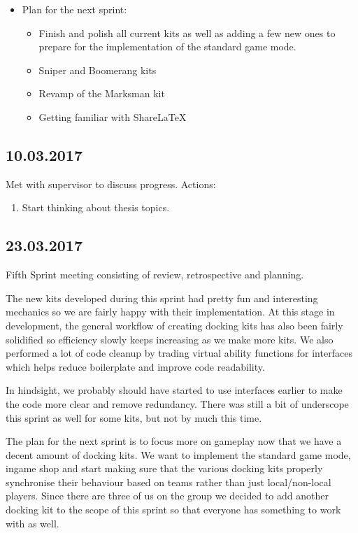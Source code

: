 \begin{itemize}
    \item Plan for the next sprint:
    \begin{itemize}
        \item Finish and polish all current kits as well as adding a few new ones to prepare for the implementation of the standard game mode.
        \item Sniper and Boomerang kits
        \item Revamp of the Marksman kit
        \item Getting familiar with ShareLaTeX
    \end{itemize}
\end{itemize}

\subsection*{10.03.2017}
Met with supervisor to discuss progress. Actions:
\begin{enumerate}
    \item Start thinking about thesis topics.
\end{enumerate}

\subsection*{23.03.2017}
Fifth Sprint meeting consisting of review, retrospective and planning.

The new kits developed during this sprint had pretty fun and interesting mechanics so we are fairly happy with their implementation. At this stage in development, the general workflow of creating docking kits has also been fairly solidified so efficiency slowly keeps increasing as we make more kits. We also performed a lot of code cleanup by trading virtual ability functions for interfaces which helps reduce boilerplate and improve code readability. 

In hindsight, we probably should have started to use interfaces earlier to make the code more clear and remove redundancy. There was still a bit of underscope this sprint as well for some kits, but not by much this time. 

The plan for the next sprint is to focus more on gameplay now that we have a decent amount of docking kits. We want to implement the standard game mode, ingame shop and start making sure that the various docking kits properly synchronise their behaviour based on teams rather than just local/non-local players. Since there are three of us on the group we decided to add another docking kit to the scope of this sprint so that everyone has something to work with as well. 

